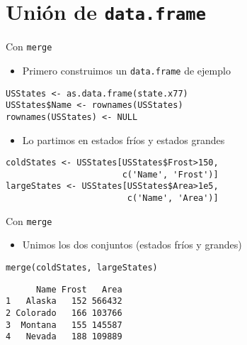 \documentclass[xcolor={usenames,svgnames,dvipsnames}]{beamer}
\begin{document}
\section{Unión de \texttt{data.frame}}
\label{sec:org59c161e}
\begin{frame}[fragile,label={sec:org18d840c}]{Con \texttt{merge}}
 \begin{itemize}
\item Primero construimos un \texttt{data.frame} de ejemplo
\end{itemize}
\lstset{language=r,label= ,caption= ,captionpos=b,numbers=none}
\begin{lstlisting}
USStates <- as.data.frame(state.x77)
USStates$Name <- rownames(USStates)
rownames(USStates) <- NULL
\end{lstlisting}

\begin{itemize}
\item Lo partimos en estados \guillemotleft{}fríos\guillemotright{} y estados \guillemotleft{}grandes\guillemotright{}
\end{itemize}
\lstset{language=r,label= ,caption= ,captionpos=b,numbers=none}
\begin{lstlisting}
coldStates <- USStates[USStates$Frost>150,
                       c('Name', 'Frost')]
largeStates <- USStates[USStates$Area>1e5,
                        c('Name', 'Area')]
\end{lstlisting}
\end{frame}

\begin{frame}[fragile,label={sec:org61f02c6}]{Con \texttt{merge}}
 \begin{itemize}
\item Unimos los dos conjuntos (estados \guillemotleft{}fríos\guillemotright{} y \guillemotleft{}grandes\guillemotright{})
\end{itemize}
\lstset{language=r,label= ,caption= ,captionpos=b,numbers=none}
\begin{lstlisting}
merge(coldStates, largeStates)
\end{lstlisting}

\begin{verbatim}
      Name Frost   Area
1   Alaska   152 566432
2 Colorado   166 103766
3  Montana   155 145587
4   Nevada   188 109889
\end{verbatim}
\end{frame}
\end{document}
